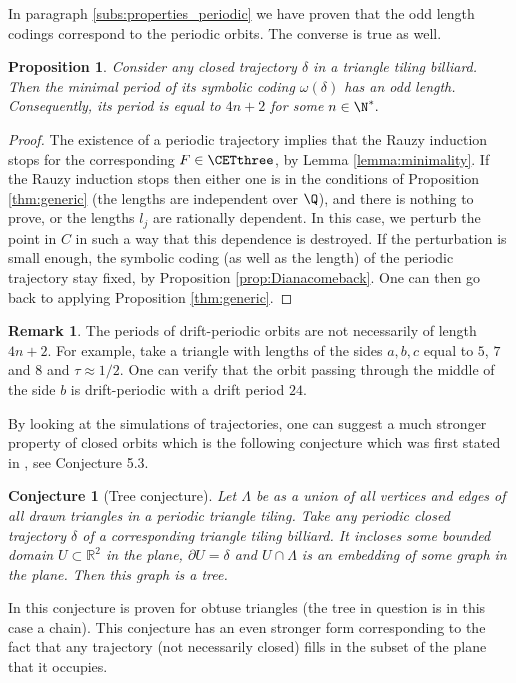 \documentclass[12pt]{article}
\newtheorem{proposition}{Proposition}
\newtheorem{conjecture}{Conjecture}
\theoremstyle{definition}
\newtheorem*{remark}{Remark}
\begin{document}
In paragraph \ref{subs:properties_periodic} we have proven that the odd length codings correspond to the periodic orbits. The converse is true as well. 

\begin{proposition}\label{thm:period}
Consider any closed trajectory  $\delta$ in a triangle tiling billiard. Then the minimal period of its symbolic coding $\omega(\delta)$ has an odd length. Consequently, its period is equal to $4n+2$ for some $n \in \N^*.$
\end{proposition}
\begin{proof}
The existence of a periodic trajectory implies that the Rauzy induction stops for the corresponding $F \in \CETthree$, by Lemma \ref{lemma:minimality}. If the Rauzy induction stops then either one is in the conditions of Proposition \ref{thm:generic} (the lengths are independent over $\Q$), and there is nothing to prove, or the lengths $l_j$ are rationally dependent. In this case, we perturb the point in $C$ in such a way that this dependence is destroyed. If the perturbation is small enough, the symbolic coding (as well as the length) of the periodic trajectory stay fixed, by Proposition \ref{prop:Dianacomeback}. One can then go back to applying Proposition \ref{thm:generic}.
\end{proof}

\begin{remark}
The periods of drift-periodic orbits are not necessarily of length $4n+2$. For example, take a triangle with lengths of the sides $a,b,c$ equal to $5$, $7$ and $8$ and $\tau \approx 1/2$. One can verify that the orbit passing through the middle of the side $b$ is drift-periodic with a drift period $24$.
\end{remark}

By looking at the simulations of trajectories, one can suggest a much stronger property of closed orbits which is the following conjecture which was first stated in \cite{BDFI18}, see Conjecture 5.3.

\begin{conjecture}[Tree conjecture]\label{conj:tree}
Let $\Lambda$ be as a union of all vertices and edges of all drawn triangles in a periodic triangle tiling.
Take any periodic closed trajectory $\delta$ of a corresponding triangle tiling billiard. It incloses some bounded domain $U \subset \mathbb{R}^2$ in the plane, $\partial U = \delta$ and $U \cap \Lambda$ is an embedding of some graph in the plane. Then this graph is a \emph{tree}. 
\end{conjecture}
In \cite{BDFI18} this conjecture is proven for obtuse triangles (the tree in question is in this case a chain). This conjecture has an even stronger form corresponding to the fact that any trajectory (not necessarily closed) fills in the subset of the plane that it occupies.
\end{document}

